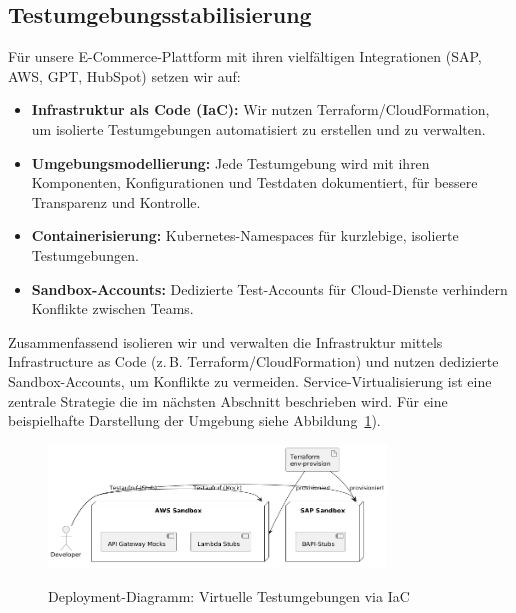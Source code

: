 \subsection{Testumgebungsstabilisierung}
Für unsere E-Commerce-Plattform mit ihren vielfältigen Integrationen (SAP, AWS, GPT, HubSpot) setzen wir auf:
\begin{itemize}
    \item \textbf{Infrastruktur als Code (IaC):} Wir nutzen Terraform/CloudFormation, um isolierte Testumgebungen automatisiert zu erstellen und zu verwalten.
    \item \textbf{Umgebungsmodellierung:} Jede Testumgebung wird mit ihren Komponenten, Konfigurationen und Testdaten dokumentiert, für bessere Transparenz und Kontrolle.
    \item \textbf{Containerisierung:} Kubernetes-Namespaces für kurzlebige, isolierte Testumgebungen.
    \item \textbf{Sandbox-Accounts:} Dedizierte Test-Accounts für Cloud-Dienste verhindern Konflikte zwischen Teams.
\end{itemize}
Zusammenfassend isolieren wir und verwalten die Infrastruktur mittels Infrastructure as Code (z.\,B. Terraform/CloudFormation) und nutzen dedizierte Sandbox-Accounts, um Konflikte zu vermeiden. Service-Virtualisierung ist eine zentrale Strategie die im nächsten Abschnitt beschrieben wird. Für eine beispielhafte Darstellung der Umgebung siehe Abbildung~\ref{fig:deployment}).
\begin{figure}[h!]
\centering
\caption{Deployment-Diagramm: Virtuelle Testumgebungen via IaC}
    \includegraphics[width=0.8\textwidth]{fig/stubing.png}
    \label{fig:deployment}
\end{figure}
